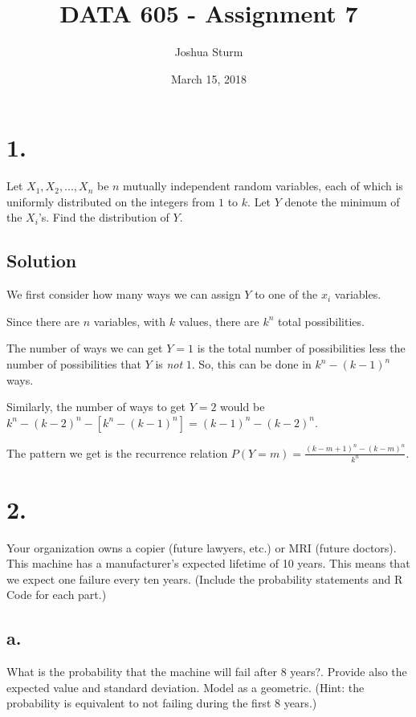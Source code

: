 \documentclass[]{article}
\title{DATA 605 - Assignment 7}
\author{Joshua Sturm}
\date{March 15, 2018}
\begin{document}
\maketitle

\section{1.}\label{section}

Let \(X_1, X_2, . . . , X_n\) be \(n\) mutually independent random
variables, each of which is uniformly distributed on the integers from
\(1\) to \(k\). Let \(Y\) denote the minimum of the \(X_i\)'s. Find the
distribution of \(Y\).

\subsection{Solution}\label{solution}

We first consider how many ways we can assign \(Y\) to one of the
\(x_i\) variables.

Since there are \(n\) variables, with \(k\) values, there are \(k^n\)
total possibilities.

The number of ways we can get \(Y = 1\) is the total number of
possibilities less the number of possibilities that \(Y\) is
\textit{not} \(1\). So, this can be done in \(k^{n} - (k-1)^n\) ways.

Similarly, the number of ways to get \(Y = 2\) would be
\(k^{n} - (k-2)^{n} - [k^{n} - (k-1)^{n}] = (k-1)^{n} - (k-2)^{n}\).

The pattern we get is the recurrence relation
\(P(Y = m) = \frac{(k-m+1)^{n} - (k-m)^{n}}{k^{n}}\).

\section{2.}\label{section-1}

Your organization owns a copier (future lawyers, etc.) or MRI (future
doctors). This machine has a manufacturer's expected lifetime of 10
years. This means that we expect one failure every ten years. (Include
the probability statements and R Code for each part.)

\subsection{a.}\label{a.}

What is the probability that the machine will fail after 8 years?.
Provide also the expected value and standard deviation. Model as a
geometric. (Hint: the probability is equivalent to not failing during
the first 8 years.)
\end{document}
